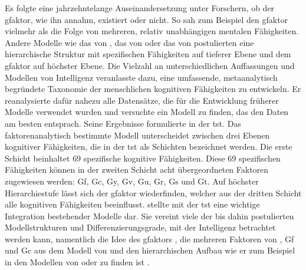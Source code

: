 \documentclass[11pt, twoside, a4paper]{book}		%
\begin{document}
Es folgte eine jahrzehntelange Auseinandersetzung unter Forschern, ob der \gls{gfaktor}, wie ihn \citeauthor{Spearman1927} annahm, existiert oder nicht. So sah zum Beispiel \citet{Thurstone1938} den \gls{gfaktor} vielmehr als die Folge von mehreren, relativ unabhängigen mentalen Fähigkeiten. 
Andere Modelle wie das von \citet{Vernon1950}, das von \citet{Cattell1971} oder das von \citet{Jaeger1984} postulierten eine hierarchische Struktur mit spezifischen Fähigkeiten auf tieferer Ebene und dem \gls{gfaktor} auf höchster Ebene. 
Die Vielzahl an unterschiedlichen Auffassungen und Modellen von Intelligenz veranlasste \citet{Carroll1993} dazu, eine umfassende, meta\-ana\-ly\-tisch begründete Taxonomie der menschlichen kognitiven Fähigkeiten zu entwickeln. Er reanalysierte dafür nahezu alle Datensätze, die für die Entwicklung früherer Modelle verwendet wurden und versuchte ein Modell zu finden, das den Daten am besten entsprach. Seine Ergebnisse formulierte \citeauthor{Carroll1993} in der \gls{tst}.
Das faktorenanalytisch bestimmte Modell unterscheidet zwischen drei Ebenen kognitiver Fähigkeiten, die in der \gls{tst} als Schichten bezeichnet werden. Die erste Schicht beinhaltet $69$ spezifische kognitive Fähigkeiten. Diese $69$ spezifischen Fähigkeiten können in der zweiten Schicht acht übergeordneten Faktoren zugewiesen werden: \gls{Gf}, \gls{Gc}, \gls{Gy}, \gls{Gv}, \gls{Gu}, \gls{Gr}, \gls{Gs} und \gls{Gt}.
Auf höchster Hierarchiestufe lässt sich der \gls{gfaktor} wiederfinden, welcher aus der dritten Schicht alle kognitiven Fähigkeiten beeinflusst.
\citeauthor{Carroll1993} stellte mit der \gls{tst} eine wichtige Integration bestehender Modelle dar. 
Sie vereint viele der bis dahin postulierten Modellstrukturen und Differenzierungsgrade, mit der Intelligenz betrachtet werden kann, namentlich die Idee des \gls{gfaktor}s \citep{Spearman1904, Spearman1927}, die mehreren Faktoren von \citet{Thurstone1938}, \gls{Gf} und \gls{Gc} aus dem Modell von \citet{Cattell1971} und den hierarchischen Aufbau wie er zum Beispiel in den Modellen von \citet{Vernon1950} oder \citet{Jaeger1984} zu finden ist \citep[für eine Erweiterung der \gls{tst} siehe][]{McGrew2005, McGrew2009}.
\end{document}
